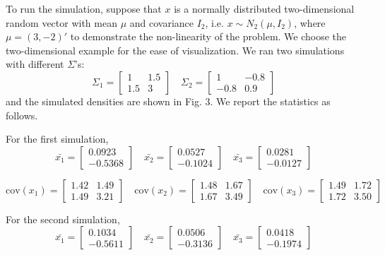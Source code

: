 \documentclass[a4paper, 11pt]{article}
\begin{document}
To run the simulation, suppose that $x$ is a normally distributed two-dimensional random vector with mean $\mu$ and covariance $I_2$, i.e. $x\sim N_2(\mu, I_2)$, where $\mu = (3, -2)'$ to demonstrate the non-linearity of the problem. We choose the two-dimensional example for the ease of visualization. We ran two simulations with different $\Sigma$'s:
\begin{equation}
\Sigma_1 = \begin{bmatrix}
1 & 1.5 \\
1.5 & 3
\end{bmatrix} \quad \Sigma_2 = \begin{bmatrix}
1 & -0.8 \\
-0.8 & 0.9
\end{bmatrix}
\end{equation}
and the simulated densities are shown in Fig. 3. We report the statistics as follows. 

For the first simulation, 
\begin{equation}
\bar{x_1} = \begin{bmatrix}
0.0923 \\
-0.5368
\end{bmatrix} \quad \bar{x_2} = \begin{bmatrix}
0.0527 \\
-0.1024
\end{bmatrix} \quad \bar{x_3} = \begin{bmatrix}
0.0281 \\
-0.0127
\end{bmatrix}
\end{equation}

\begin{equation}
\text{cov}(x_1) = \begin{bmatrix}
1.42 & 1.49 \\
1.49 & 3.21
\end{bmatrix} \quad \text{cov}(x_2) = \begin{bmatrix}
1.48 & 1.67 \\
1.67 & 3.49
\end{bmatrix} \quad \text{cov}(x_3) = \begin{bmatrix}
1.49 & 1.72 \\
1.72 & 3.50
\end{bmatrix}
\end{equation}

For the second simulation, 
\begin{equation}
\bar{x_1} = \begin{bmatrix}
0.1034 \\
-0.5611
\end{bmatrix} \quad \bar{x_2} = \begin{bmatrix}
0.0506 \\
-0.3136
\end{bmatrix} \quad \bar{x_3} = \begin{bmatrix}
0.0418 \\
-0.1974
\end{bmatrix}
\end{equation}
\end{document}

